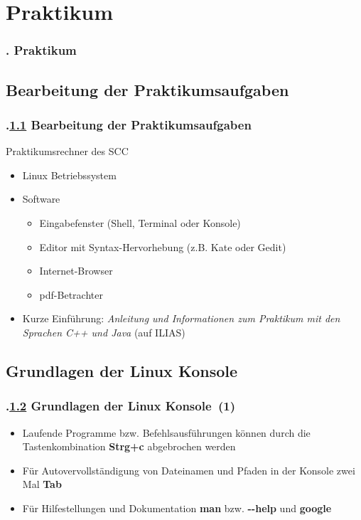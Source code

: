 \AtBeginSection{}
\section{Praktikum}
\begin{frame}
  \frametitle{\kap. Praktikum}%
\tableofcontents[currentsection]
\end{frame}


\def\stitle{Bearbeitung der Praktikumsaufgaben}%
\subsection{\stitle}\label{S:PraktikumSCC}
\begin{frame}[t]%
  \frametitle{\kap.\ref{S:PraktikumSCC} \stitle}%
\medskip

Praktikumsrechner des SCC
\begin{itemize}
  \item Linux Betriebssystem
  \item Software
  \begin{itemize}
    \item Eingabefenster (Shell, Terminal oder Konsole)
    \item Editor mit Syntax-Hervorhebung (z.B. Kate oder Gedit)
    \item Internet-Browser
    \item pdf-Betrachter
  \end{itemize}
  \item Kurze Einf\"uhrung: \emph{Anleitung und Informationen zum Praktikum mit den Sprachen C++ und Java} (auf ILIAS)
\end{itemize}
\end{frame}


\def\stitle{Grundlagen der Linux Konsole}%
\subsection{\stitle}\label{S:Anleitung}
\begin{frame}[t]%
\frametitle{\kap.\ref{S:Anleitung} \stitle\ (1)}%

\begin{itemize}
  \item Laufende Programme bzw. Befehlsausf\"uhrungen k\"onnen durch die Tastenkombination \textbf{Strg+c} abgebrochen werden
  \item F\"ur Autovervollst\"andigung von Dateinamen und Pfaden in der Konsole zwei Mal \textbf{Tab}
  \item F\"ur Hilfestellungen und Dokumentation \textbf{man} bzw. \textbf{-{}-help} und \textbf{google}
\end{itemize}

\end{frame}


